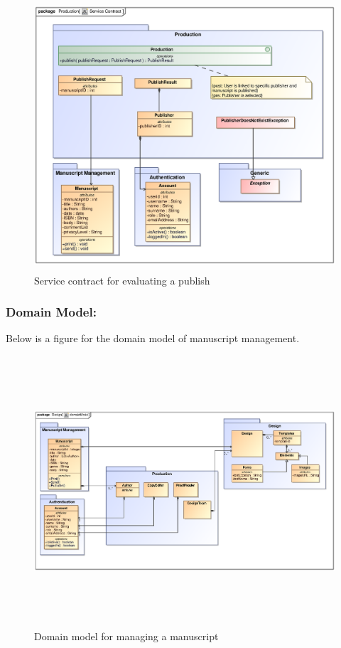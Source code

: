 \begin{enumerate}
\begin{figure}[h]
\includegraphics[height=380px, width=500px]{epsImages/Production/Publish.eps}
\caption{Service contract for evaluating a publish}
\end{figure}

 \newpage
\subsubsection{Domain Model:} Below is a figure for the domain model of manuscript management. 

\begin{figure}[h]
\includegraphics[height=380px, width=500px]{epsImages/DomainModels/ProductionDomainModel.eps}
\caption{Domain model for managing a manuscript}
\end{figure}


\end{enumerate}

